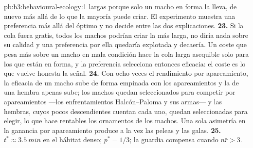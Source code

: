\begin{solution}{pb:b3:behavioural-ecology:1}
largas porque solo un macho en forma la lleva, de nuevo más allá de lo
que la mayoría puede criar. El experimento muestra una preferencia más
allá del óptimo y no decide entre las dos explicaciones.
\textbf{23.} Si la cola fuera gratis, todos los machos podrían criar la
más larga, no diría nada sobre su calidad y una preferencia por ella
quedaría explotada y decaería. Un coste que pesa más sobre un macho en
mala condición hace la cola larga asequible solo para los que están en
forma, y la preferencia selecciona entonces eficacia: el coste es lo que
vuelve honesta la señal.
\textbf{24.} Con ocho veces el rendimiento por apareamiento, la eficacia
de un macho sube de forma empinada con los apareamientos y la de una
hembra apenas sube; los machos quedan seleccionados para competir por
apareamientos ---los enfrentamientos Halcón--Paloma y sus armas--- y las
hembras, cuyos pocos descendientes cuentan cada uno, quedan
seleccionadas para elegir, lo que hace rentables los ornamentos de los
machos. Una sola asimetría en la ganancia por apareamiento produce a la
vez las peleas y las galas.
\textbf{25.} $t^{*} \approx \qty{3.5}{min}$ en el hábitat denso; $p^{*}
= 1/3$; la guardia compensa cuando $n\bar r > 3$.
\end{solution}
